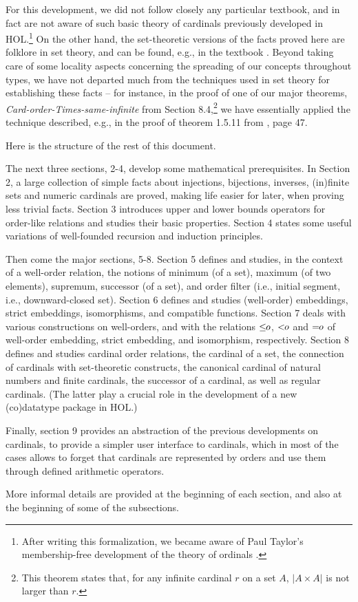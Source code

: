 For this development, we did not follow closely any particular textbook, and in fact are not
aware of such basic theory of cardinals previously
developed in HOL.\footnote{After writing this formalization, we became aware of
Paul Taylor's membership-free development of the theory of ordinals \cite{taylor-ordinals}.} On
the other hand,
the set-theoretic versions of the facts proved here are folklore in set theory, and can be found,
e.g., in the textbook \cite{card-book}.  Beyond taking care of some locality aspects
concerning the spreading of our concepts throughout types, we have not departed
much from the techniques used in set theory for establishing these facts -- for instance,
in the proof of one of our major theorems,
\textit{Card-order-Times-same-infinite} from Section 8.4,\footnote{This theorem states that, for any
infinite cardinal $r$ on a set $A$, $|A\times A|$ is not larger than $r$.}
we have essentially applied the technique described, e.g., in the proof of
theorem 1.5.11 from \cite{card-book}, page 47.

Here is the structure of the rest of this document.

The next three sections, 2-4, develop some
mathematical prerequisites.
In Section 2, a large collection of simple facts about
injections, bijections, inverses, (in)finite sets and numeric cardinals are proved,
making life easier
for later, when proving less trivial facts.
Section 3 introduces upper and lower
bounds operators for order-like relations and studies their basic properties.
Section 4 states some useful variations of well-founded recursion and induction principles.

Then come the major sections, 5-8.
Section 5 defines and studies, in the context of a well-order relation,
the notions of minimum (of a set), maximum (of two elements), supremum, successor (of a set),
and order filter (i.e., initial segment, i.e., downward-closed set).
Section 6 defines and studies (well-order) embeddings, strict embeddings, isomorphisms, and
compatible functions.
Section 7 deals with various constructions on well-orders, and with the relations
$\mbox{$\leq\!\!o$}$, $\mbox{$<\!\!o$}$ and $\mbox{$=\!\!o$}$ of well-order embedding, strict embedding, and isomorphism, respectively.
Section 8 defines and studies cardinal order relations, the cardinal of a set, the connection
of cardinals with set-theoretic constructs,
the canonical cardinal of natural numbers and finite cardinals, the successor
of a cardinal, as well as regular cardinals. (The latter play a crucial role in the development of 
a new (co)datatype package in HOL.)

Finally, section 9 provides an abstraction of the previous developments on
cardinals, to provide a simpler user interface to cardinals, which in most of
the cases allows to forget that cardinals are represented by orders and use them
through defined arithmetic operators.

More informal details are provided at the beginning of each section, and also at the
beginning of some of the subsections.
